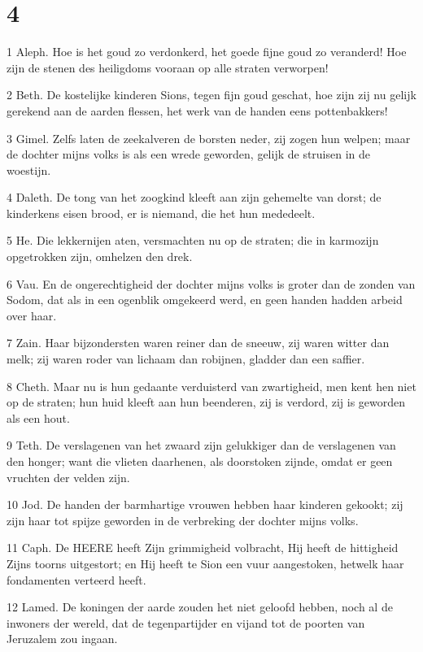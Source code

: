 \chapter{4}

\par 1 Aleph. Hoe is het goud zo verdonkerd, het goede fijne goud zo veranderd! Hoe zijn de stenen des heiligdoms vooraan op alle straten verworpen!
\par 2 Beth. De kostelijke kinderen Sions, tegen fijn goud geschat, hoe zijn zij nu gelijk gerekend aan de aarden flessen, het werk van de handen eens pottenbakkers!
\par 3 Gimel. Zelfs laten de zeekalveren de borsten neder, zij zogen hun welpen; maar de dochter mijns volks is als een wrede geworden, gelijk de struisen in de woestijn.
\par 4 Daleth. De tong van het zoogkind kleeft aan zijn gehemelte van dorst; de kinderkens eisen brood, er is niemand, die het hun mededeelt.
\par 5 He. Die lekkernijen aten, versmachten nu op de straten; die in karmozijn opgetrokken zijn, omhelzen den drek.
\par 6 Vau. En de ongerechtigheid der dochter mijns volks is groter dan de zonden van Sodom, dat als in een ogenblik omgekeerd werd, en geen handen hadden arbeid over haar.
\par 7 Zain. Haar bijzondersten waren reiner dan de sneeuw, zij waren witter dan melk; zij waren roder van lichaam dan robijnen, gladder dan een saffier.
\par 8 Cheth. Maar nu is hun gedaante verduisterd van zwartigheid, men kent hen niet op de straten; hun huid kleeft aan hun beenderen, zij is verdord, zij is geworden als een hout.
\par 9 Teth. De verslagenen van het zwaard zijn gelukkiger dan de verslagenen van den honger; want die vlieten daarhenen, als doorstoken zijnde, omdat er geen vruchten der velden zijn.
\par 10 Jod. De handen der barmhartige vrouwen hebben haar kinderen gekookt; zij zijn haar tot spijze geworden in de verbreking der dochter mijns volks.
\par 11 Caph. De HEERE heeft Zijn grimmigheid volbracht, Hij heeft de hittigheid Zijns toorns uitgestort; en Hij heeft te Sion een vuur aangestoken, hetwelk haar fondamenten verteerd heeft.
\par 12 Lamed. De koningen der aarde zouden het niet geloofd hebben, noch al de inwoners der wereld, dat de tegenpartijder en vijand tot de poorten van Jeruzalem zou ingaan.
